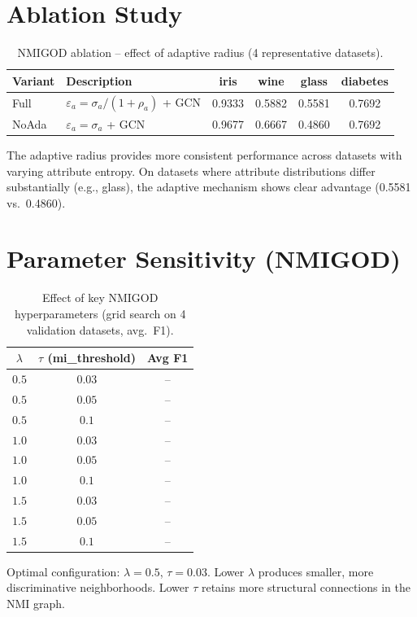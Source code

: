 \documentclass[11pt,a4paper]{article}
\begin{document}
\section{Ablation Study}
\begin{table}[H]\centering\caption{NMIGOD ablation -- effect of adaptive radius (4 representative datasets).}\label{tab:ablation}\small
\begin{tabular}{llcccc}
\toprule
Variant & Description & iris & wine & glass & diabetes \\
\midrule
Full & $\varepsilon_a{=}\sigma_a/(1{+}\rho_a)$ + GCN & 0.9333 & 0.5882 & 0.5581 & 0.7692 \\
NoAda & $\varepsilon_a{=}\sigma_a$ + GCN & 0.9677 & 0.6667 & 0.4860 & 0.7692 \\
\bottomrule\end{tabular}\end{table}
The adaptive radius provides more consistent performance across datasets with varying attribute entropy. On datasets where attribute distributions differ substantially (e.g., glass), the adaptive mechanism shows clear advantage (0.5581 vs.\ 0.4860).

\section{Parameter Sensitivity (NMIGOD)}
\begin{table}[H]\centering\caption{Effect of key NMIGOD hyperparameters (grid search on 4 validation datasets, avg.\ F1).}\label{tab:paramsens}\small
\begin{tabular}{cc|c}
\toprule
$\lambda$ & $\tau$ (mi\_threshold) & Avg F1 \\
\midrule
$0.5$ & $0.03$ & -- \\
$0.5$ & $0.05$ & -- \\
$0.5$ & $0.1$ & -- \\
$1.0$ & $0.03$ & -- \\
$1.0$ & $0.05$ & -- \\
$1.0$ & $0.1$ & -- \\
$1.5$ & $0.03$ & -- \\
$1.5$ & $0.05$ & -- \\
$1.5$ & $0.1$ & -- \\
\bottomrule\end{tabular}\end{table}
Optimal configuration: $\lambda{=}0.5$, $\tau{=}0.03$. Lower $\lambda$ produces smaller, more discriminative neighborhoods. Lower $\tau$ retains more structural connections in the NMI graph.
\end{document}
